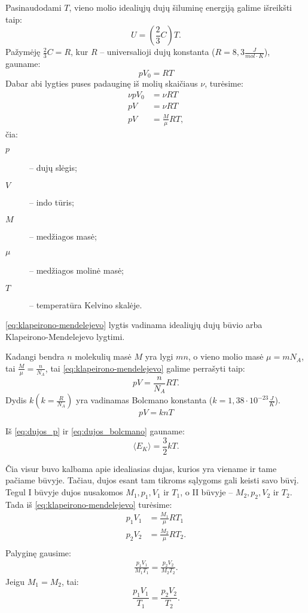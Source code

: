 Pasinaudodami $T$, vieno molio idealiųjų dujų šiluminę energiją
galime išreikšti taip:
\begin{equation*}
  U = \left( \frac{2}{3}C \right)T.
\end{equation*}
Pažymėję $\frac{2}{3}C = R$, kur $R$ – universalioji dujų konstanta
($R = 8,3 \frac{J}{mol \cdot K}$), gauname:
\begin{equation*}
  p V_{0} = RT
\end{equation*}
Dabar abi lygties puses padauginę iš molių skaičiaus $\nu$, turėsime:
\begin{align}
  \nu p V_{0} &= \nu R T \\
  pV &= \nu R T \label{eq:klapeirono-mendelejevo} \\
  pV &= \frac{M}{\mu} R T,
\end{align}
čia:
\begin{description}
  \item[$p$] – dujų slėgis;
  \item[$V$] – indo tūris;
  \item[$M$] – medžiagos masė;
  \item[$\mu$] – medžiagos molinė masė;
  \item[$T$] – temperatūra Kelvino skalėje.
\end{description}
\ref{eq:klapeirono-mendelejevo} lygtis vadinama idealiųjų dujų būvio
arba Klapeirono-Mendelejevo lygtimi.

Kadangi bendra $n$ molekulių masė $M$ yra lygi $mn$, o vieno molio
masė $\mu = m N_{A}$, tai $\frac{M}{\mu} = \frac{n}{N_{A}}$, tai
\ref{eq:klapeirono-mendelejevo} galime perrašyti taip:
\begin{equation*}
  pV = \frac{n}{N_{A}}RT.
\end{equation*}
Dydis $k (k = \frac{R}{N_{A}})$ yra vadinamas Bolcmano konstanta
($k = 1,38 \cdot 10^{-23} \frac{J}{K}$).
\begin{equation}
  pV = knT
  \label{eq:dujos_bolcmano}
\end{equation}

Iš \ref{eq:dujos_p} ir \ref{eq:dujos_bolcmano} gauname:
\begin{equation*}
  \langle E_{K} \rangle = \frac{3}{2} k T.
\end{equation*}

Čia visur buvo kalbama apie idealiasias dujas, kurios yra viename ir
tame pačiame būvyje. Tačiau, dujos esant tam tikroms sąlygoms gali
keisti savo būvį. Tegul I būvyje dujos nusakomos
$M_{1}, p_{1}, V_{1}$ ir $T_{1}$, o II būvyje –
$M_{2}, p_{2}, V_{2}$ ir $T_{2}$. Tada iš \ref{eq:klapeirono-mendelejevo}
turėsime:
\begin{align*}
  p_{1}V_{1} &= \frac{M_{1}}{\mu}RT_{1} \\
  p_{2}V_{2} &= \frac{M_{2}}{\mu}RT_{2}. \\
\end{align*}
Palyginę gausime:
\begin{align*}
  \frac{p_{1}V_{1}}{M_{1}T_{1}} = \frac{p_{2}V_{2}}{M_{2}T_{2}}.
\end{align*}
Jeigu $M_{1} = M_{2}$, tai:
\begin{equation*}
  \frac{p_{1}V_{1}}{T_{1}} = \frac{p_{2}V_{2}}{T_{2}}.
\end{equation*}

